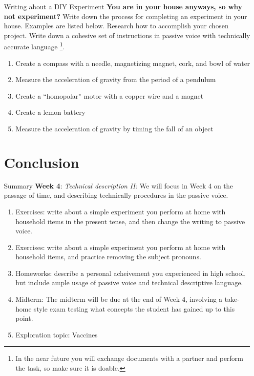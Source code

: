 \documentclass{beamer}
\begin{document}
\begin{frame}{Writing about a DIY Experiment}
\small
\textbf{\alert{You are in your house anyways, so why not experiment?}} Write down the process for completing an experiment in your house.  Examples are listed below.  Research how to accomplish your chosen project.  Write down a cohesive set of instructions in passive voice with technically accurate language \footnote{In the near future you will exchange documents with a partner and perform the task, so make sure it is doable.}.
\begin{enumerate}
\item Create a compass with a needle, magnetizing magnet, cork, and bowl of water
\item Measure the acceleration of gravity from the period of a pendulum
\item Create a ``homopolar'' motor with a copper wire and a magnet
\item Create a lemon battery
\item Measure the acceleration of gravity by timing the fall of an object
\end{enumerate}
\end{frame}

\section{Conclusion}

\begin{frame}{Summary}
\small
\textbf{Week 4}: \textit{Technical description II:} We will focus in Week 4 on the passage of time, and describing technically
procedures in the passive voice.
\begin{enumerate}
\item Exercises: write about a simple experiment you perform at home with household items in the present tense, and then change the writing to passive voice.
\item Exercises: write about a simple experiment you perform at home with household items, and practice removing the subject pronouns.
\item Homeworks: describe a personal acheivement you experienced in high school, but include ample usage of
passive voice and technical descriptive language.
\item Midterm: The midterm will be due at the end of Week 4, involving a take-home style exam testing what concepts the student has gained up to this point.
\item Exploration topic: Vaccines
\end{enumerate}
\end{frame}
\end{document}

